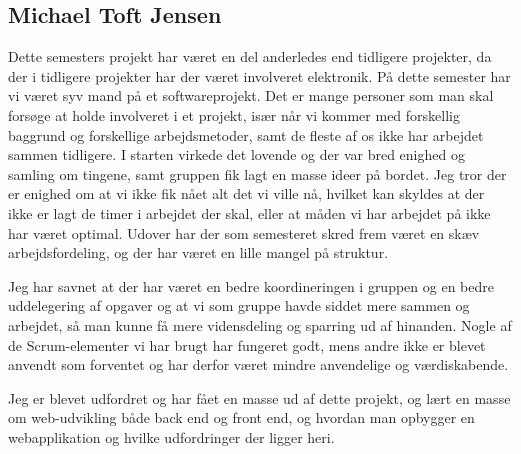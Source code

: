 \subsection*{Michael Toft Jensen}
Dette semesters projekt har været en del anderledes end tidligere projekter, da der i tidligere projekter har der været involveret elektronik. På dette semester har vi været syv mand på et softwareprojekt. Det er mange personer som man skal forsøge at holde involveret i et projekt, især når vi kommer med forskellig baggrund og forskellige arbejdsmetoder, samt de fleste af os ikke har arbejdet sammen tidligere.
I starten virkede det lovende og der var bred enighed og samling om tingene, samt gruppen fik lagt en masse ideer på bordet. Jeg tror der er enighed om at vi ikke fik nået alt det vi ville nå, hvilket kan skyldes at der ikke er lagt de timer i arbejdet der skal, eller at måden vi har arbejdet på ikke har været optimal.
Udover har der som semesteret skred frem været en skæv arbejdsfordeling, og der har været en lille mangel på struktur.

Jeg har savnet at der har været en bedre koordineringen i gruppen og en bedre uddelegering af opgaver og at vi som gruppe havde siddet mere sammen og arbejdet, så man kunne få mere vidensdeling og sparring ud af hinanden. Nogle af de Scrum-elementer vi har brugt har fungeret godt, mens andre ikke er blevet anvendt som forventet og har derfor været mindre anvendelige og værdiskabende.

Jeg er blevet udfordret og har fået en masse ud af dette projekt, og lært en masse om web-udvikling både back end og front end, og hvordan man opbygger en webapplikation og hvilke udfordringer der ligger heri.